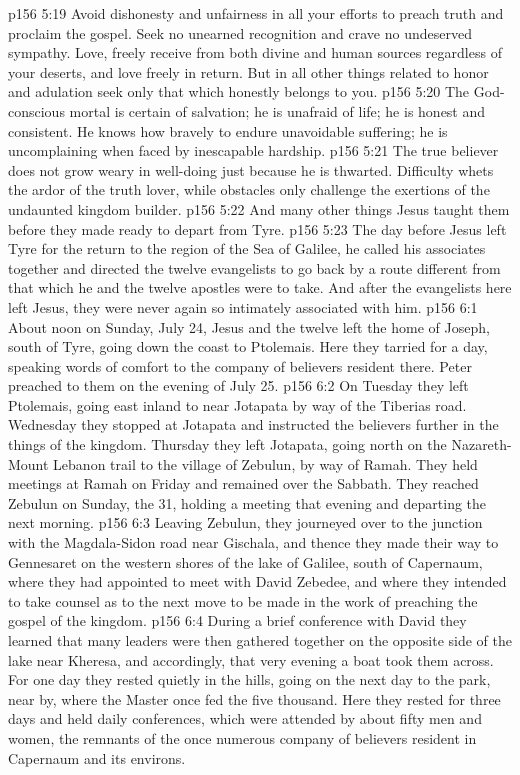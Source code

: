 \vs p156 5:19 Avoid dishonesty and unfairness in all your efforts to preach truth and proclaim the gospel. Seek no unearned recognition and crave no undeserved sympathy. Love, freely receive from both divine and human sources regardless of your deserts, and love freely in return. But in all other things related to honor and adulation seek only that which honestly belongs to you.
\vs p156 5:20 The God\hyp{}conscious mortal is certain of salvation; he is unafraid of life; he is honest and consistent. He knows how bravely to endure unavoidable suffering; he is uncomplaining when faced by inescapable hardship.
\vs p156 5:21 The true believer does not grow weary in well\hyp{}doing just because he is thwarted. Difficulty whets the ardor of the truth lover, while obstacles only challenge the exertions of the undaunted kingdom builder.
\pc \vs p156 5:22 And many other things Jesus taught them before they made ready to depart from Tyre.
\vs p156 5:23 The day before Jesus left Tyre for the return to the region of the Sea of Galilee, he called his associates together and directed the twelve evangelists to go back by a route different from that which he and the twelve apostles were to take. And after the evangelists here left Jesus, they were never again so intimately associated with him.\plusone
{}
\vs p156 6:1 About noon on Sunday, July 24, Jesus and the twelve left the home of Joseph, south of Tyre, going down the coast to Ptolemais. Here they tarried for a day, speaking words of comfort to the company of believers resident there. Peter preached to them on the evening of July 25.
\vs p156 6:2 On Tuesday they left Ptolemais, going east inland to near Jotapata by way of the Tiberias road. Wednesday they stopped at Jotapata and instructed the believers further in the things of the kingdom. Thursday they left Jotapata, going north on the Nazareth\hyp{}Mount Lebanon trail to the village of Zebulun, by way of Ramah. They held meetings at Ramah on Friday and remained over the Sabbath. They reached Zebulun on Sunday, the 31, holding a meeting that evening and departing the next morning.
\vs p156 6:3 Leaving Zebulun, they journeyed over to the junction with the Magdala\hyp{}Sidon road near Gischala, and thence they made their way to Gennesaret on the western shores of the lake of Galilee, south of Capernaum, where they had appointed to meet with David Zebedee, and where they intended to take counsel as to the next move to be made in the work of preaching the gospel of the kingdom.
\vs p156 6:4 During a brief conference with David they learned that many leaders were then gathered together on the opposite side of the lake near Kheresa, and accordingly, that very evening a boat took them across. For one day they rested quietly in the hills, going on the next day to the park, near by, where the Master once fed the five thousand. Here they rested for three days and held daily conferences, which were attended by about fifty men and women, the remnants of the once numerous company of believers resident in Capernaum and its environs.
